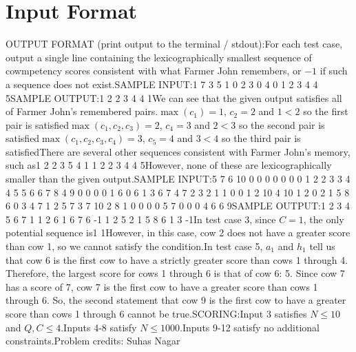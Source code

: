 \documentclass[12pt]{article}
\begin{document}
\section*{Input Format}
OUTPUT FORMAT (print output to the terminal / stdout):For each test case, output a single line containing the lexicographically
smallest sequence of cowmpetency scores consistent with what Farmer John remembers, or $-1$ if such a sequence does not
exist.SAMPLE INPUT:1
7 3 5
1 0 2 3 0 4 0
1 2
3 4
4 5SAMPLE OUTPUT:1 2 2 3 4 4 1We can see that the given output satisfies all of Farmer John's remembered
pairs.$\max(c_1) = 1$, $c_2 = 2$ and $1<2$ so the first pair is satisfied$\max(c_1,c_2,c_3) = 2$, $c_4 = 3$ and $2<3$ so the second pair is
satisfied$\max(c_1,c_2,c_3,c_4) = 3$, $c_5 = 4$ and $3<4$ so the third
pair is satisfiedThere are several other sequences consistent with Farmer John's memory, such as1 2 2 3 5 4 1
1 2 2 3 4 4 5However, none of these are lexicographically smaller than the given output.SAMPLE INPUT:5
7 6 10
0 0 0 0 0 0 0
1 2
2 3
3 4
4 5
5 6
6 7
8 4 9
0 0 0 0 1 6 0 6
1 3
6 7
4 7
2 3
2 1 1
0 0
1 2
10 4 10
1 2 0 2 1 5 8 6 0 3
4 7
1 2
5 7
3 7
10 2 8
1 0 0 0 0 5 7 0 0 0
4 6
6 9SAMPLE OUTPUT:1 2 3 4 5 6 7
1 1 2 6 1 6 7 6
-1
1 2 5 2 1 5 8 6 1 3
-1In test case 3, since $C=1$, the only potential sequence is1 1However, in this case, cow 2 does not have a greater score than cow 1, so we
cannot satisfy the condition.In test case 5, $a_1$ and $h_1$ tell us that cow 6 is the first cow to have a
strictly greater score than cows 1 through 4. Therefore, the largest score for
cows 1 through 6 is that of cow 6:  5. Since cow 7 has a score of 7, cow 7 is
the first cow to have a greater score than cows 1 through 6. So, the second
statement that cow 9 is the first cow to have a greater score than cows 1
through 6 cannot be true.SCORING:Input 3 satisfies $N \leq 10$ and $Q, C \leq 4$.Inputs 4-8 satisfy
$N \leq 1000$.Inputs 9-12 satisfy no additional constraints.Problem credits: Suhas Nagar
\end{document}
